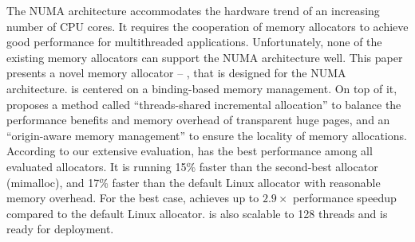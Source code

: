 The NUMA architecture accommodates the hardware trend of an increasing number of CPU cores. It requires the cooperation of memory allocators to achieve good performance for multithreaded applications. Unfortunately, none of the existing memory allocators can support the NUMA architecture well.
This paper presents a novel memory allocator -- \NM{}, that is designed for the NUMA architecture. \NM{} is centered on a binding-based memory management. On top of it, \NM{} proposes a method called ``threads-shared incremental allocation'' to balance the performance benefits and memory overhead of transparent huge pages, and
an ``origin-aware memory management'' to ensure the locality of memory allocations. 
According to our extensive evaluation, \NM{} has the best performance among all evaluated allocators. It is running 15\% faster than the second-best allocator (mimalloc), and 17\% faster than the default Linux allocator with reasonable memory overhead. For the best case, \NM{} achieves up to $2.9\times$ performance speedup compared to the default Linux allocator. \NM{} is also scalable to 128 threads and is ready for deployment.